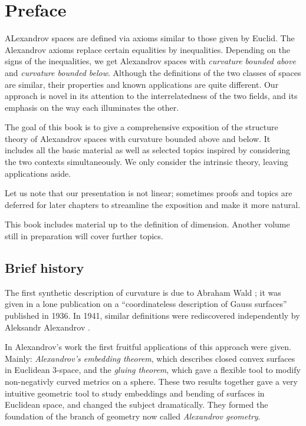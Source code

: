 \chapter*{Preface}


ALexandrov spaces are defined via axioms similar to those given by Euclid.
The Alexandrov axioms replace certain  equalities by inequalities. 
Depending on the signs of the inequalities, we get Alexandrov spaces with {}\emph{curvature bounded above} and {}\emph{curvature bounded below}.
Although the definitions of the two classes of spaces are similar, their properties and known applications are quite different.
Our approach is novel in its attention to the interrelatedness of the two fields, and its emphasis on the way each illuminates the other.


The goal of this book is to give a comprehensive exposition of the structure theory of Alexandrov spaces 
with curvature bounded above and below.
It includes all the basic material as well as selected topics inspired by considering the two contexts simultaneously.
We only consider  the intrinsic theory, leaving applications aside.

Let us note that our presentation is not linear;
sometimes proofs and topics are deferred for later chapters to streamline the exposition and make it more natural.

This book includes material up to the definition of dimension.
Another volume still in preparation will cover further topics.


\section*{Brief history}

The first synthetic description of curvature is due to Abraham Wald \cite{wald}; 
it was given in a lone publication on a ``coordinateless description of Gauss surfaces'' published in 1936.
In 1941, similar definitions were rediscovered independently by Aleksandr Alexandrov \cite{alexandrov:def}.

In Alexandrov's work the first fruitful applications of this approach were given.
Mainly: {}\emph{Alexandrov's embedding theorem}, which describes closed convex surfaces in Euclidean 3-space,
and the {}\emph{gluing theorem}, which gave a flexible tool to modify non-negativly curved metrics on a sphere.
These two results together gave  a very intuitive geometric tool to study embeddings and bending of surfaces in Euclidean space, and changed the subject dramatically.
They formed the foundation of the branch of geometry now called {}\emph{Alexandrov geometry}.


